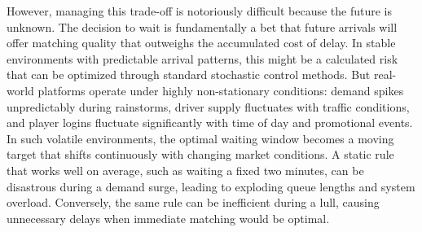 However, managing this trade-off is notoriously difficult because the future is unknown.
The decision to wait is fundamentally a bet that future arrivals will offer matching quality that outweighs the accumulated cost of delay.
In stable environments with predictable arrival patterns, this might be a calculated risk that can be optimized through standard stochastic control methods.
But real-world platforms operate under highly non-stationary conditions: demand spikes unpredictably during rainstorms, driver supply fluctuates with traffic conditions, and player logins fluctuate significantly with time of day and promotional events.
In such volatile environments, the optimal waiting window becomes a moving target that shifts continuously with changing market conditions.
A static rule that works well on average, such as waiting a fixed two minutes, can be disastrous during a demand surge, leading to exploding queue lengths and system overload. 
Conversely, the same rule can be inefficient during a lull, causing unnecessary delays when immediate matching would be optimal.

